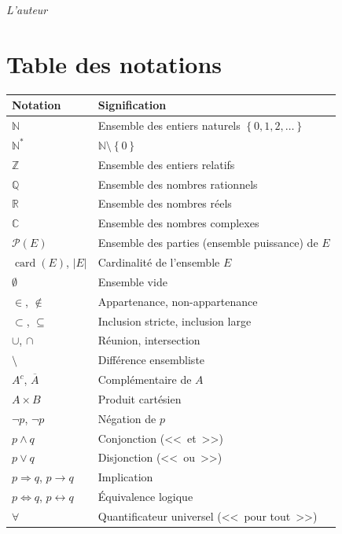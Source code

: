 \documentclass[12pt,a4paper,openany]{book}
\theoremstyle{definition}
\theoremstyle{plain}
\theoremstyle{remark}
\newcommand{\N}{\mathbb{N}}
\newcommand{\Z}{\mathbb{Z}}
\newcommand{\Q}{\mathbb{Q}}
\newcommand{\R}{\mathbb{R}}
\newcommand{\C}{\mathbb{C}}
\newcommand{\abs}[1]{\left|#1\right|}
\newcommand{\set}[1]{\left\{#1\right\}}
\newcommand{\powerset}{\mathcal{P}}
\DeclareMathOperator{\card}{card}
\begin{document}
\vfill
\hfill\textit{L'auteur}

\chapter*{Table des notations}
\label{ch:notations}

\begin{longtable}{@{} >{\raggedright\arraybackslash}p{4cm} p{9cm} @{}}
\toprule
\textbf{Notation} & \textbf{Signification} \\
\midrule
\endhead
$\N$ & Ensemble des entiers naturels $\set{0,1,2,\dots}$ \\[4pt]
$\N^*$ & $\N \setminus \set{0}$ \\[4pt]
$\Z$ & Ensemble des entiers relatifs \\[4pt]
$\Q$ & Ensemble des nombres rationnels \\[4pt]
$\R$ & Ensemble des nombres r\'eels \\[4pt]
$\C$ & Ensemble des nombres complexes \\[4pt]
$\powerset(E)$ & Ensemble des parties (ensemble puissance) de $E$ \\[4pt]
$\card(E)$, $\abs{E}$ & Cardinalit\'e de l'ensemble $E$ \\[4pt]
$\emptyset$ & Ensemble vide \\[4pt]
$\in$, $\notin$ & Appartenance, non-appartenance \\[4pt]
$\subset$, $\subseteq$ & Inclusion stricte, inclusion large \\[4pt]
$\cup$, $\cap$ & R\'eunion, intersection \\[4pt]
$\setminus$ & Diff\'erence ensembliste \\[4pt]
$A^c$, $\overline{A}$ & Compl\'ementaire de $A$ \\[4pt]
$A \times B$ & Produit cart\'esien \\[4pt]
$\neg p$, $\lnot p$ & N\'egation de $p$ \\[4pt]
$p \land q$ & Conjonction (<<~et~>>) \\[4pt]
$p \lor q$ & Disjonction (<<~ou~>>) \\[4pt]
$p \Rightarrow q$, $p \to q$ & Implication \\[4pt]
$p \Leftrightarrow q$, $p \leftrightarrow q$ & \'Equivalence logique \\[4pt]
$\forall$ & Quantificateur universel (<<~pour tout~>>) \\[4pt]

\end{longtable}
\end{document}
